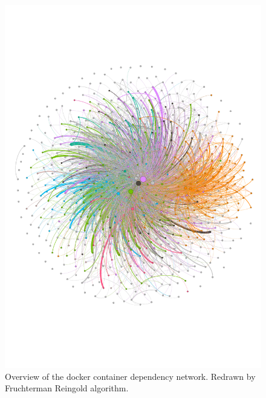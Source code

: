 \documentclass[sigconf]{acmart}
\begin{document}

\begin{figure}[h!]
  \centering
  \includegraphics[width=0.97\columnwidth]{picture/overview_imagenet.pdf}\vspace{-0.3cm}  
\caption{Overview of the docker container dependency network.  Redrawn by Fruchterman Reingold algorithm.}
\label{fig:full}
\end{figure}
\end{document}
